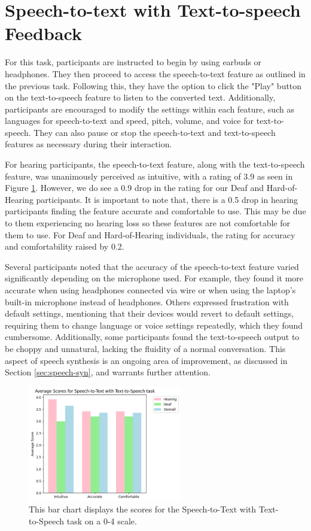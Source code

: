 \documentclass{l4proj}
\begin{document}
\section{Speech-to-text with Text-to-speech Feedback}

For this task, participants are instructed to begin by using earbuds or headphones. They then proceed to access the speech-to-text feature as outlined in the previous task. Following this, they have the option to click the "Play" button on the text-to-speech feature to listen to the converted text. Additionally, participants are encouraged to modify the settings within each feature, such as languages for speech-to-text and speed, pitch, volume, and voice for text-to-speech. They can also pause or stop the speech-to-text and text-to-speech features as necessary during their interaction.

For hearing participants, the speech-to-text feature, along with the text-to-speech feature, was unanimously perceived as intuitive, with a rating of 3.9 as seen in Figure \ref{fig:STT-TTS-chart}. However, we do see a 0.9 drop in the rating for our Deaf and Hard-of-Hearing participants. It is important to note that, there is a 0.5 drop in hearing participants finding the feature accurate and comfortable to use. This may be due to them experiencing no hearing loss so these features are not comfortable for them to use. For Deaf and Hard-of-Hearing individuals, the rating for accuracy and comfortability raised by 0.2. 

Several participants noted that the accuracy of the speech-to-text feature varied significantly depending on the microphone used. For example, they found it more accurate when using headphones connected via wire or when using the laptop's built-in microphone instead of headphones. Others expressed frustration with default settings, mentioning that their devices would revert to default settings, requiring them to change language or voice settings repeatedly, which they found cumbersome. Additionally, some participants found the text-to-speech output to be choppy and unnatural, lacking the fluidity of a normal conversation. This aspect of speech synthesis is an ongoing area of improvement, as discussed in Section \ref{sec:speech-syn}, and warrants further attention. 

\begin{figure}
    \centering
    \includegraphics[width=0.6\textwidth]{dissertation/images/STT-TTS.png}
    \caption{This bar chart displays the scores for the Speech-to-Text with Text-to-Speech task on a 0-4 scale.}
    \label{fig:STT-TTS-chart}
\end{figure}
\end{document}
